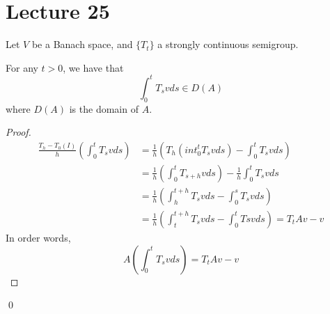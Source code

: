 \section{Lecture 25}
Let $V$ be a Banach space, and $\{T_t\}$ a strongly continuous semigroup.
\begin{proposition}
    For any $t>0$, we have that 
    \begin{equation*}
        \int_0^tT_svds\in{D}(A)
    \end{equation*}
    where $D(A)$ is the domain of $A$.
\end{proposition}

\begin{proof}
    \begin{align*}
        \frac{T_h-T_0(I)}{h}\left(\int_0^t T_svds\right)&=\frac{1}{h}\left( T_h\left(int_0^tT_svds\right)-\int_0^tT_svds\right)\\
        &=\frac{1}{h}\left(\int_0^tT_{s+h}vds\right)-\frac{1}{h}\int_0^tT_svds\\
        &=\frac{1}{h}\left(\int_h^{t+h}T_svds-\int_0^sT_svds\right)\\
        &=\frac{1}{h}\left(\int_t^{t+h}T_svds-\int_0^tTsvds\right)=T_tAv-v
    \end{align*}
    In order words, 
    \begin{equation*}
        A\left(\int_0^tT_svds\right)=T_tAv-v
    \end{equation*}
\end{proof}
\qed

